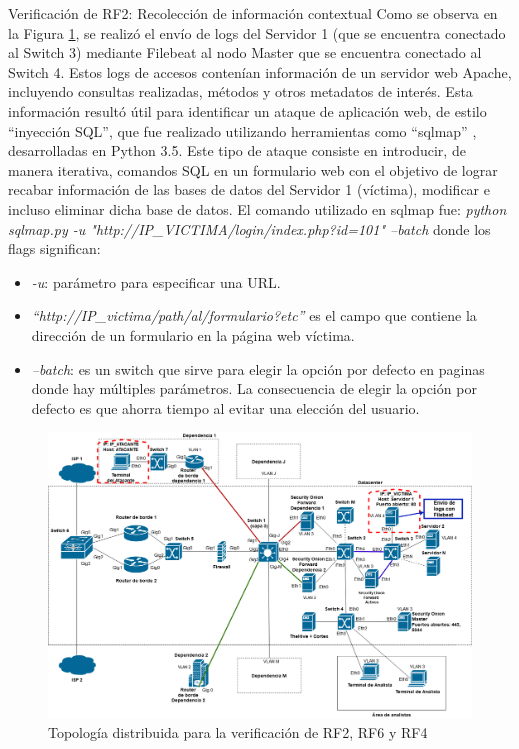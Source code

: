 \begin{section}{Verificación de RF2: Recolección de información contextual}
    Como se observa en la Figura \ref{fig:figura_iter2_ataque}, se realizó el envío de logs del Servidor 1 (que se encuentra conectado al Switch 3) mediante Filebeat al nodo Master que se encuentra conectado al Switch 4. Estos logs de accesos contenían información de un servidor web Apache, incluyendo consultas realizadas, métodos y otros metadatos de interés. Esta información resultó útil para identificar un ataque de aplicación web, de estilo “inyección SQL”, que fue realizado utilizando herramientas como “sqlmap” \cite{sqlmap}, desarrolladas en Python 3.5. Este tipo de ataque consiste en introducir, de manera iterativa, comandos SQL en un formulario web con el objetivo de lograr recabar información de las bases de datos del Servidor 1 (víctima), modificar e incluso eliminar dicha base de datos. El comando utilizado en sqlmap fue:
    \textit{python sqlmap.py -u "http://IP\_VICTIMA/login/index.php?id=101" --batch} donde los flags significan:
    \begin{itemize}
    \item \textit{-u}: parámetro para especificar una URL.
    \item \textit{“http://IP\_victima/path/al/formulario?etc”} es el campo que contiene la dirección de un formulario en la página web víctima.
    \item \textit{--batch}: es un switch que sirve para elegir la opción por defecto en paginas donde hay múltiples parámetros. La consecuencia de elegir la opción por defecto es que ahorra tiempo al evitar una elección del usuario.
    \end{itemize}
    \begin{figure}[H]
    \centering
    \includegraphics[width=1\textwidth]{./iteracion_2_imagenes/Topologia de despliegue descentralizada RF2, RF6 y RF4-FILEBEAT.png}
    \caption{Topología distribuida para la verificación de RF2, RF6 y RF4}
    \label{fig:figura_iter2_ataque}
    \end{figure}
    \FloatBarrier


\end{section}
